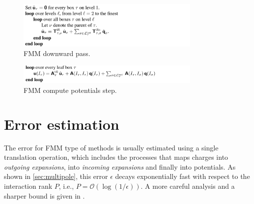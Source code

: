 \documentclass[final,onefignum,onetabnum]{siamart220329}
\newcommand{\Ocal}{\mathcal{O}}
\begin{document}
\begin{figure}[h!]
	\centering
	\includegraphics[width=0.8\textwidth]{downfmm}
	\caption{FMM downward pass.}
	\label{fig:downfmm}
\end{figure}
\begin{figure}[h!]
	\centering
	\includegraphics[width=0.8\textwidth]{potfmm}
	\caption{FMM compute potentials step.}
	\label{fig:potfmm}
\end{figure}

\section{Error estimation}\label{sec:err}
The error for FMM type of methods is usually estimated using a single translation operation, which includes the processes that maps charges into \textit{outgoing expansions}, into \textit{incoming expansions} and finally into potentials. As shown in \cref{sec:multipole}, this error $\epsilon$ decays exponentially fast with respect to the interaction rank $P$, i.e., $P=\Ocal(\log(1/\epsilon))$. A more careful analysis and a sharper bound is given in \cite{petersen1995error}. 
\end{document}
